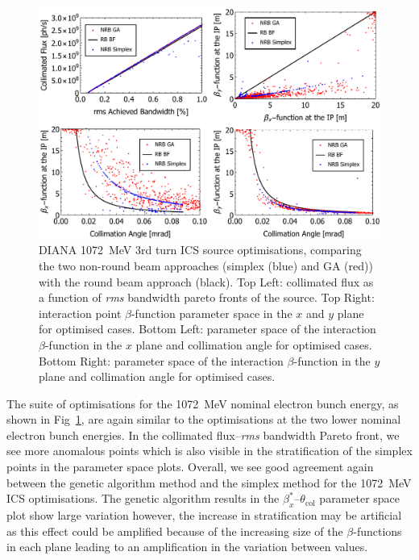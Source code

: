 \documentclass[../main.tex]{subfiles}
\begin{document}
\begin{figure}[!h]
\centering
\includegraphics[width=\textwidth]{Figures/DIANA_Inverse_Compton_Source_Design/DIANA_Tuning_Curve_Opt/DIANA1072fullcomp.pdf}
\caption{DIANA 1072~\si{\mega\electronvolt} 3rd turn ICS source optimisations, comparing the two non-round beam approaches (simplex (blue) and GA (red)) with the round beam approach (black). Top Left: collimated flux as a function of \textit{rms} bandwidth pareto fronts of the source. Top Right: interaction point $\beta$-function parameter space in the $x$ and $y$ plane for optimised cases. Bottom Left: parameter space of the interaction $\beta$-function in the $x$ plane and collimation angle for optimised cases. Bottom Right: parameter space of the interaction $\beta$-function in the $y$ plane and collimation angle for optimised cases.}
\label{fig:DIANA1072_comparison_optimisation}
\end{figure}

The suite of optimisations for the 1072~\si{\mega\electronvolt} nominal electron bunch energy, as shown in Fig~\ref{fig:DIANA1072_comparison_optimisation}, are again similar to the optimisations at the two lower nominal electron bunch energies. In the collimated flux--\textit{rms} bandwidth Pareto front, we see more anomalous points which is also visible in the stratification of the simplex points in the parameter space plots. Overall, we see good agreement again between the genetic algorithm method and the simplex method for the 1072~\si{\mega\electronvolt} ICS optimisations. The genetic algorithm results in the $\beta_{x}^{*}$--$\theta_{\mathrm{col}}$ parameter space plot show large variation however, the increase in stratification may be artificial as this effect could be amplified because of the increasing size of the $\beta$-functions in each plane leading to an amplification in the variation between values.    
\end{document}
